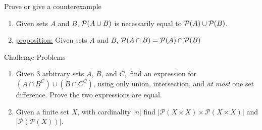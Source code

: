 \documentclass{article}
\theoremstyle{definition}
\begin{document}
	Prove or give a counterexample

	\begin{enumerate}
		\item[1]
		Given sets $A$ and $B$, ${\cal P}(A\cup B)$ is necessarily equal
		to ${\cal P}(A)\cup{\cal P}(B)$.

		\vspace{.2cm}




		\item[2] \underline{proposition:} Given sets $A$ and $B$, ${\cal
		P}(A\cap B)={\cal P}(A)\cap{\cal P}(B)$

		\vspace{.2cm}



	\end{enumerate}

	\vspace{1cm}


	\noindent Challenge Problems  \vspace{0.3cm}


	\begin{enumerate}
		\item[1] Given 3 arbitrary sets $A$, $B$, and $C,$ find an expression for $(A\cap B^C)\cup (B\cap C^C)$, using only union, intersection, and \emph{at most} one set difference. Prove the two expressions are equal.

		\item[2] Given a finite set $X$, with cardinality $|n|$ find $|\mathcal{P}(X\times X)\times\mathcal{P}(X\times X)|$ and $|\mathcal{P}(\mathcal{P}(X))|.$
	\end{enumerate}
\end{document}
